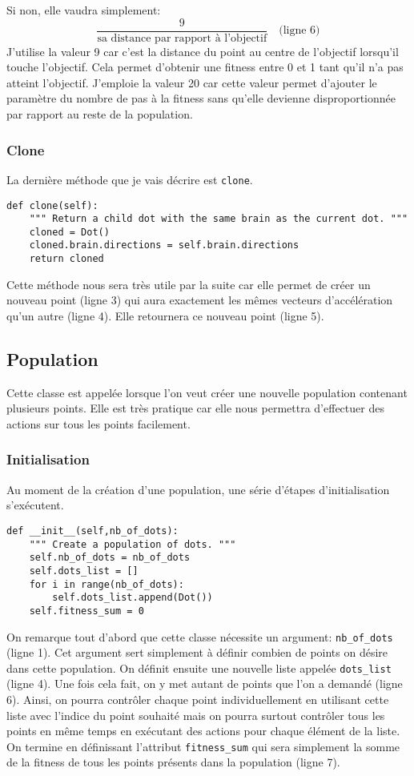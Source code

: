 \documentclass[12pt, a4paper, openany]{book}
\begin{document}
\noindent
Si non, elle vaudra simplement: \[\frac{9}{\textrm{sa distance par rapport à l'objectif}}\quad\textrm{(ligne 6)}\]
J'utilise la valeur 9 car c'est la distance du point au centre de l'objectif lorsqu'il touche l'objectif. Cela permet d'obtenir une fitness entre 0 et 1 tant qu'il n'a pas atteint l'objectif. J'emploie la valeur 20 car cette valeur permet d'ajouter le paramètre du nombre de \og pas\fg{} à la fitness sans qu'elle devienne disproportionnée par rapport au reste de la population.

\subsubsection{Clone}
La dernière méthode que je vais décrire est \verb'clone'.
\begin{verbatim}
def clone(self):
	""" Return a child dot with the same brain as the current dot. """
	cloned = Dot()
	cloned.brain.directions = self.brain.directions
	return cloned
\end{verbatim}
Cette méthode nous sera très utile par la suite car elle permet de créer un nouveau point (ligne 3) qui aura exactement les mêmes vecteurs d'accélération qu'un autre (ligne 4). Elle retournera ce nouveau point (ligne 5).

\subsection{Population}
Cette classe est appelée lorsque l'on veut créer une nouvelle population contenant plusieurs points. Elle est très pratique car elle nous permettra d'effectuer des actions sur tous les points facilement.

\subsubsection{Initialisation}
Au moment de la création d'une population, une série d'étapes d'initialisation s'exécutent.
\begin{verbatim}
def __init__(self,nb_of_dots):
	""" Create a population of dots. """
	self.nb_of_dots = nb_of_dots
	self.dots_list = []
	for i in range(nb_of_dots):
		self.dots_list.append(Dot())
	self.fitness_sum = 0
\end{verbatim}
On remarque tout d'abord que cette classe nécessite un argument: \verb'nb_of_dots' (ligne 1). Cet argument sert simplement à définir combien de points on désire dans cette population. On définit ensuite une nouvelle liste appelée \verb'dots_list' (ligne 4). Une fois cela fait, on y met autant de points que l'on a demandé (ligne 6). Ainsi, on pourra contrôler chaque point individuellement en utilisant cette liste avec l'indice du point souhaité mais on pourra surtout contrôler tous les points en même temps en exécutant des actions pour chaque élément de la liste. On termine en définissant l'attribut \verb'fitness_sum' qui sera simplement la somme de la fitness de tous les points présents dans la population (ligne 7).
\end{document}
